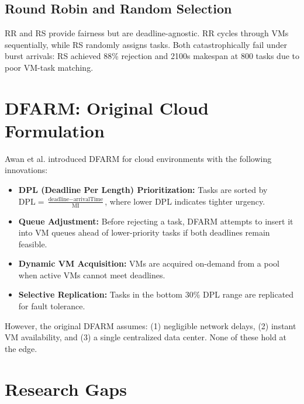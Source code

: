 \documentclass[12pt]{report}
\begin{document}
\subsection{Round Robin and Random Selection}

RR and RS provide fairness but are deadline-agnostic. RR cycles through VMs sequentially, while RS randomly assigns tasks. Both catastrophically fail under burst arrivals: RS achieved 88\% rejection and 2100s makespan at 800 tasks due to poor VM-task matching.

\section{DFARM: Original Cloud Formulation}

Awan et al. \cite{dfarm_2024} introduced DFARM for cloud environments with the following innovations:

\begin{itemize}
    \item \textbf{DPL (Deadline Per Length) Prioritization:} Tasks are sorted by $\text{DPL} = \frac{\text{deadline} - \text{arrivalTime}}{\text{MI}}$, where lower DPL indicates tighter urgency.
    
    \item \textbf{Queue Adjustment:} Before rejecting a task, DFARM attempts to insert it into VM queues ahead of lower-priority tasks if both deadlines remain feasible.
    
    \item \textbf{Dynamic VM Acquisition:} VMs are acquired on-demand from a pool when active VMs cannot meet deadlines.
    
    \item \textbf{Selective Replication:} Tasks in the bottom 30\% DPL range are replicated for fault tolerance.
\end{itemize}

However, the original DFARM assumes: (1) negligible network delays, (2) instant VM availability, and (3) a single centralized data center. None of these hold at the edge.

\section{Research Gaps}
\end{document}
